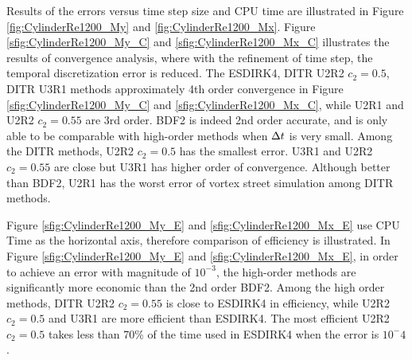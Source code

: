 Results of the errors versus time step size and CPU time
are illustrated in
Figure \ref{fig:CylinderRe1200_My} and \ref{fig:CylinderRe1200_Mx}.
Figure \ref{sfig:CylinderRe1200_My_C} and \ref{sfig:CylinderRe1200_Mx_C}
illustrates the results of convergence analysis, where
with the refinement of time step, the temporal
discretization error is reduced.
The ESDIRK4, DITR U2R2 $c_2=0.5$, DITR U3R1 methods
approximately 4th order convergence in
Figure \ref{sfig:CylinderRe1200_My_C} and \ref{sfig:CylinderRe1200_Mx_C},
while U2R1 and U2R2 $c_2=0.55$ are 3rd order.
BDF2 is indeed 2nd order accurate, and is only able
to be comparable with high-order methods when $\mathrm\Delta t$
is very small.
Among the DITR methods, U2R2 $c_2=0.5$ has the smallest error.
U3R1 and U2R2 $c_2=0.55$ are close but U3R1 has higher order of convergence.
Although better than BDF2,
U2R1 has the worst error of vortex street simulation among DITR methods.

Figure \ref{sfig:CylinderRe1200_My_E} and \ref{sfig:CylinderRe1200_Mx_E}
use CPU Time as the horizontal axis, therefore comparison of efficiency is illustrated.
In Figure \ref{sfig:CylinderRe1200_My_E} and \ref{sfig:CylinderRe1200_Mx_E},
in order to achieve an error with magnitude of $10^{-3}$, the
high-order methods are significantly more economic than the
2nd order BDF2.
Among the high order methods, DITR U2R2 $c_2=0.55$ is
close to ESDIRK4 in efficiency, while
U2R2 $c_2=0.5$ and U3R1 are more efficient than ESDIRK4.
The most efficient U2R2 $c_2=0.5$ takes less than 70\% of
the time used in ESDIRK4 when the error is $10^-4$.




